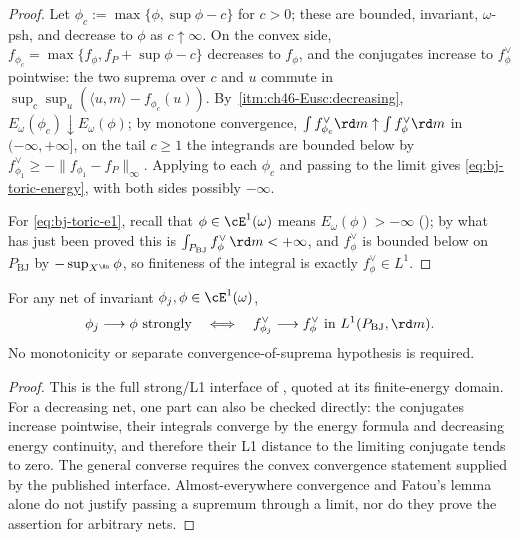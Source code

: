 \begin{proof}
Let $\phi_c:=\max\{\phi,\sup\phi-c\}$ for $c>0$; these are bounded,
invariant, $\omega$-psh, and decrease to $\phi$ as $c\uparrow\infty$.
On the convex side, $f_{\phi_c}=\max\{f_\phi,f_P+\sup\phi-c\}$ decreases
to $f_\phi$, and the conjugates increase to $f^\vee_\phi$ pointwise:
the two suprema over $c$ and $u$ commute in
$\sup_c\sup_u(\langle u,m\rangle-f_{\phi_c}(u))$.
By \,\cref{itm:ch46-Eusc:decreasing},
$E_\omega(\phi_c)\downarrow E_\omega(\phi)$; by monotone convergence,
$\int f^\vee_{\phi_c}\rd m\uparrow\int f^\vee_\phi\rd m$ in
$(-\infty,+\infty]$, on the tail $c\ge1$ the integrands are bounded below by
$f^\vee_{\phi_1}\ge-\|f_{\phi_1}-f_P\|_\infty$.  Applying
 to each $\phi_c$ and passing to the
limit gives \eqref{eq:bj-toric-energy}, with both sides possibly
$-\infty$.

For \eqref{eq:bj-toric-e1}, recall that $\phi\in\cE^1(\omega)$ means
$E_\omega(\phi)>-\infty$ (); by what has just been proved
this is $\int_{P_{\mathrm{BJ}}}f^\vee_\phi\,\rd m<+\infty$, and
$f^\vee_\phi$ is bounded below on $P_{\mathrm{BJ}}$ by
$-\sup_{X^{\An}}\phi$, so finiteness of the integral is exactly
$f^\vee_\phi\in L^1$.
\end{proof}

\begin{proposition}
\label{prop:ch49-toric-strong-L1}
For any net of invariant $\phi_j,\phi\in\cE^1(\omega)$,
\[
 \phi_j\longrightarrow\phi\ \text{strongly}
 \quad\Longleftrightarrow\quad
 f^\vee_{\phi_j}\longrightarrow f^\vee_\phi
       \ \text{in }L^1(P_{\mathrm{BJ}},\rd m).
\]
No monotonicity or separate convergence-of-suprema hypothesis is required.
\end{proposition}

\begin{proof}
This is the full strong/L1 interface of
\cite[Appendix~B, p.~831]{BJ22}, quoted at its finite-energy domain.
For a decreasing net, one part can also be checked directly:
the conjugates increase pointwise, their integrals converge by the
energy formula and decreasing energy continuity, and therefore
their L1 distance to the limiting conjugate tends to zero.
The general converse requires the convex convergence statement supplied
by the published interface.  Almost-everywhere convergence and Fatou's
lemma alone do not justify passing a supremum through a limit, nor
do they prove the assertion for arbitrary nets.
\end{proof}

